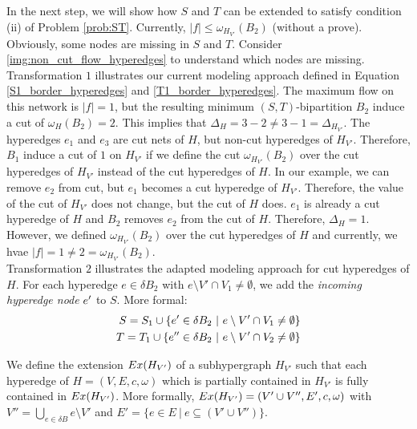 In the next step, we will show how $S$ and $T$ can be extended to satisfy condition (ii)
of Problem \autoref{prob:ST}. Currently, $|f| \le \omega_{H_{V'}}(B_2)$ (without a prove).
Obviously, some nodes are missing in $S$ and $T$. Consider \autoref{img:non_cut_flow_hyperedges}
to understand which nodes are missing. Transformation $1$ illustrates our current modeling
approach defined in Equation \ref{S1_border_hyperedges} and \ref{T1_border_hyperedges}. The maximum
flow on this network is $|f| = 1$, but the resulting minimum $(S,T)$-bipartition $B_2$ induce
a cut of $\omega_{H}(B_2) = 2$. This implies that $\Delta_H = 3 - 2 \neq 3 - 1 = \Delta_{H_{V'}}$.
The hyperedges $e_1$ and $e_3$ are cut nets of $H$, but non-cut hyperedges of $H_{V'}$. 
Therefore, $B_1$ induce a cut of $1$ on $H_{V'}$ if we define the cut $\omega_{H_{V'}}(B_2)$
over the cut hyperedges of $H_{V'}$ instead of the cut hyperedges of $H$. In our example, we can
remove $e_2$ from cut, but $e_1$ becomes a cut hyperedge of $H_{V'}$. Therefore, the value of the
cut of $H_{V'}$ does not change, but the cut of $H$ does. $e_1$ is already a cut hyperedge of $H$ and $B_2$ removes
$e_2$ from the cut of $H$. Therefore, $\Delta_H = 1$. However, we defined $\omega_{H_{V'}}(B_2)$
over the cut hyperedges of $H$ and currently, we hvae $|f| = 1 \neq 2 = \omega_{H_{V'}}(B_2)$. \\
Transformation $2$ illustrates the adapted modeling approach for cut hyperedges of $H$.
For each hyperedge $e \in \delta B_2$ with $e \setminus V' \cap V_1 \neq \emptyset$, 
we add the \emph{incoming hyperedge node} $e'$ to $S$.
More formal:
\begin{align}
S = S_1 \cup \{e' \in \delta B_2\ |\ e \setminus V' \cap V_1  \neq \emptyset\} \label{S_border_hyperedges}\\
T = T_1 \cup \{e'' \in \delta B_2\ |\ e \setminus V' \cap V_2 \neq \emptyset \} \label{T_border_hyperedges}
\end{align}

\begin{definition}
\label{def:sub_extension}
We define the extension $Ex(H_{V'})$ of a subhypergraph $H_{V'}$ such that each hyperedge of $H = (V,E,c,\omega)$ which is
partially contained in $H_{V'}$ is fully contained in $Ex(H_{V'})$. More formally,
$Ex(H_{V'}) = (V' \cup V'', E', c, \omega)$ with $V'' = \bigcup_{e \in \delta B} e \setminus V'$
and $E' = \{e \in E\ |\ e \subseteq (V' \cup V'')\}$.
\end{definition}

